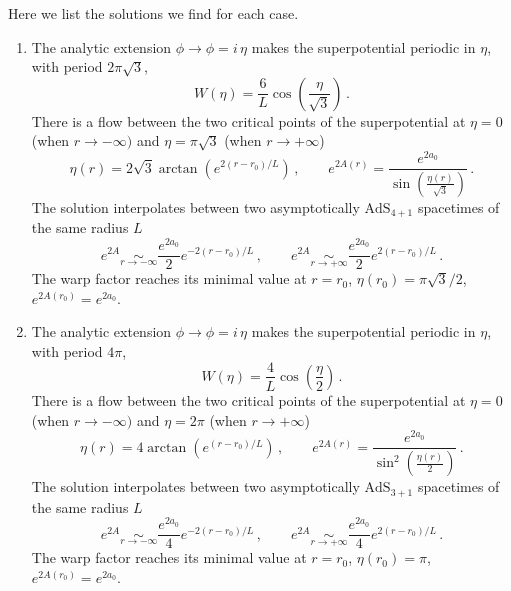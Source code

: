 Here we list the solutions we find for each case. 
\begin{enumerate}
	\item The analytic extension $\phi\to \phi=i\, \eta$ makes the superpotential periodic in $\eta$, with period $2\pi\sqrt{3}$,
\begin{equation}
	\label{eq:Wex1}
	W(\eta) = \frac{6}{L} \cos\left(\frac{\eta}{\sqrt{3}}\right)\,.
\end{equation}
There is a flow between the two critical points of the superpotential at $\eta=0$ (when $r\to-\infty)$ and $\eta=\pi\sqrt{3}$ (when $r\to +\infty$)
\begin{equation}\label{eq:sol1}
	\eta(r)=2\sqrt{3} \arctan\left(e^{2(r-r_0)/L} \right)
	\,,\qquad 
	e^{2A(r)}=\frac{e^{2a_0}}{\sin\left(\frac{\eta(r)}{\sqrt{3}}\right)}\,.
\end{equation}
The solution interpolates between two asymptotically $\text{AdS}_{4+1}$ spacetimes of the same radius $L$
\begin{equation}
	e^{2A} \underset{r\to-\infty}{\sim} \frac{e^{2a_0}}{2}e^{-2(r-r_0)/L}
	\,,\qquad 
	e^{2A} \underset{r\to +\infty}{\sim} \frac{e^{2a_0}}{2}e^{2(r-r_0)/L}\,.
\end{equation}
The warp factor reaches its minimal value at $r=r_0$, $\eta(r_0)=\pi\sqrt{3}/2$, $e^{2A(r_0)}=e^{2a_0}$.

	\item The analytic extension $\phi\to \phi=i\, \eta$ makes the superpotential periodic in $\eta$, with period $4\pi$,
\begin{equation}
	\label{eq:Wex2}
	W(\eta)=\frac{4}{L}\cos\left(\frac{\eta}{2}\right)\,.
\end{equation}
There is a flow between the two critical points of the superpotential at $\eta=0$ (when $r\to-\infty)$ and $\eta=2\pi$ (when $r\to +\infty$)
\begin{equation}\label{eq:sol2}
	\eta(r)=4 \arctan\left(e^{(r-r_0)/L} \right)
	\,,\qquad e^{2A(r)}=\frac{e^{2a_0}}{\sin^2\left(\frac{\eta(r)}{2}\right)}\,.
\end{equation}
The solution interpolates between two asymptotically $\text{AdS}_{3+1}$ spacetimes of the same radius $L$
\begin{equation}
	e^{2A} \underset{r\to-\infty}{\sim} \frac{e^{2a_0}}{4}e^{-2(r-r_0)/L}
	\,,\qquad 
	e^{2A} \underset{r\to +\infty}{\sim} \frac{e^{2a_0}}{4}e^{2(r-r_0)/L}\,.
\end{equation}
The warp factor reaches its minimal value at $r=r_0$, $\eta(r_0)=\pi$, $e^{2A(r_0)}=e^{2a_0}$.


\end{enumerate}
